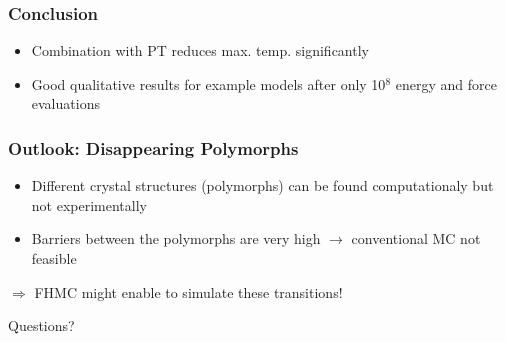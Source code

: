 \documentclass{beamer}
\begin{document}
	\begin{frame}
		\frametitle{Conclusion}
		\begin{itemize}
			\item Combination with PT reduces max. temp. significantly
			\item Good qualitative results for example models after only 10$^8$ energy and force evaluations
		\end{itemize}
	\end{frame}

	\begin{frame}
		\frametitle{Outlook: Disappearing Polymorphs}
		\begin{itemize}
			\item Different crystal structures (polymorphs) can be found computationaly but not experimentally
			\item Barriers between the polymorphs are very high $\rightarrow$ conventional MC not feasible
		\end{itemize}
		$\Longrightarrow$ FHMC might enable to simulate these transitions!
	\end{frame}

	\begin{frame}

		\center
		\Huge
		Questions?
	\end{frame}










\begin{frame}
  	\printbibliography[heading=bibintoc]

  \end{frame}
\end{document}
